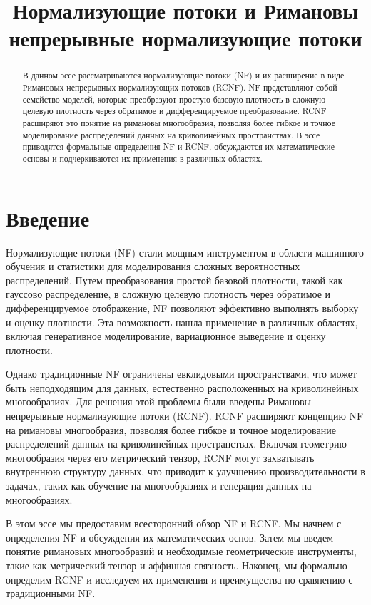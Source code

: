 \documentclass{article}
\begin{document}
\title{Нормализующие потоки и Римановы непрерывные нормализующие потоки}
\author{}
\date{}
\maketitle

\begin{abstract}
В данном эссе рассматриваются нормализующие потоки (NF) и их расширение в виде Римановых непрерывных нормализующих потоков (RCNF). NF представляют собой семейство моделей, которые преобразуют простую базовую плотность в сложную целевую плотность через обратимое и дифференцируемое преобразование. RCNF расширяют это понятие на римановы многообразия, позволяя более гибкое и точное моделирование распределений данных на криволинейных пространствах. В эссе приводятся формальные определения NF и RCNF, обсуждаются их математические основы и подчеркиваются их применения в различных областях.
\end{abstract}

\section{Введение}

Нормализующие потоки (NF) стали мощным инструментом в области машинного обучения и статистики для моделирования сложных вероятностных распределений. Путем преобразования простой базовой плотности, такой как гауссово распределение, в сложную целевую плотность через обратимое и дифференцируемое отображение, NF позволяют эффективно выполнять выборку и оценку плотности. Эта возможность нашла применение в различных областях, включая генеративное моделирование, вариационное выведение и оценку плотности.

Однако традиционные NF ограничены евклидовыми пространствами, что может быть неподходящим для данных, естественно расположенных на криволинейных многообразиях. Для решения этой проблемы были введены Римановы непрерывные нормализующие потоки (RCNF). RCNF расширяют концепцию NF на римановы многообразия, позволяя более гибкое и точное моделирование распределений данных на криволинейных пространствах. Включая геометрию многообразия через его метрический тензор, RCNF могут захватывать внутреннюю структуру данных, что приводит к улучшению производительности в задачах, таких как обучение на многообразиях и генерация данных на многообразиях.

В этом эссе мы предоставим всесторонний обзор NF и RCNF. Мы начнем с определения NF и обсуждения их математических основ. Затем мы введем понятие римановых многообразий и необходимые геометрические инструменты, такие как метрический тензор и аффинная связность. Наконец, мы формально определим RCNF и исследуем их применения и преимущества по сравнению с традиционными NF.
\end{document}
